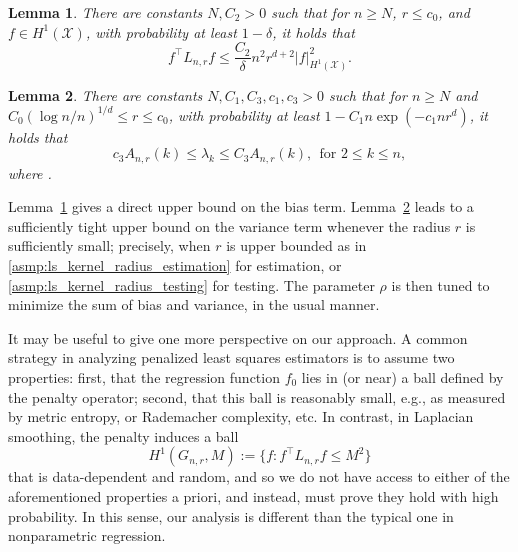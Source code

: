 \documentclass[twoside]{article}
\newcommand{\1}{\mathbf{1}}
\newcommand{\Lap}{L}
\newcommand{\Xset}{\mathcal{X}}
\newtheorem{lemma}{Lemma}
\theoremstyle{definition}
\theoremstyle{remark}
\begin{document}
\begin{lemma}
	\label{lem:graph_sobolev_seminorm}
	There are constants $N,C_2 > 0$ such that for $n \geq N$, $r \leq c_0$, and $f \in H^1(\Xset)$, with probability at least $1 - \delta$, it holds that
	\begin{equation}
	\label{eqn:graph_sobolev_seminorm}
	f^\top \Lap_{n,r} f \leq \frac{C_2}{\delta} n^2 r^{d + 2} |f|_{H^1(\Xset)}^2.
	\end{equation}
\end{lemma}

\begin{lemma}
	\label{lem:neighborhood_eigenvalue} 
	There are constants $N,C_1,C_3,c_1,c_3 > 0$ such that for $n \geq N$ and $C_0(\log n/n)^{1/d} \leq r \leq c_0$, with probability at least $1 - C_1n\exp(-c_1nr^d)$, it holds that
	\begin{equation}
	\label{eqn:neighborhood_eigenvalue}
	c_3A_{n,r}(k) \leq \lambda_k \leq C_3A_{n,r}(k), ~~\textrm{for $2 \leq k \leq n$},
	\end{equation}
	where .
\end{lemma}

Lemma~\ref{lem:graph_sobolev_seminorm} gives a direct upper bound on the bias term. Lemma~\ref{lem:neighborhood_eigenvalue} leads to a sufficiently tight upper bound on the variance term whenever the radius $r$ is sufficiently small; precisely, when $r$ is upper bounded as in \ref{asmp:ls_kernel_radius_estimation} for estimation, or \ref{asmp:ls_kernel_radius_testing} for testing. The parameter $\rho$ is then tuned to minimize the sum of bias and variance, in the usual manner.

It may be useful to give one more perspective on our approach. A common strategy in analyzing penalized least squares estimators is to assume two properties: first, that the regression function $f_0$ lies in (or near) a ball defined by the penalty operator; second, that this ball is reasonably small, e.g., as measured by metric entropy, or Rademacher complexity, etc. In contrast, in Laplacian smoothing, the penalty induces a ball
\begin{equation*}
H^1(G_{n,r},M) := \{f: f^\top \Lap_{n,r} f \leq M^2\}
\end{equation*}
that is data-dependent and random, and so we do not have access to either of the aforementioned properties a priori, and instead, must prove they hold with high probability. In this sense, our analysis is different than the typical one in nonparametric regression.
\end{document}
